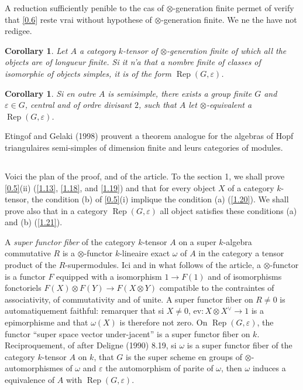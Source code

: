 \documentclass[11pt,a4paper]{article}
\theoremstyle{plain}
\newtheorem{corollary}[theorem]{Corollary}
\theoremstyle{definition}
\newcommand{\ev}{\mathrm{ev}}
\newcommand{\Rep}{\operatorname{Rep}}
\begin{document}
A reduction sufficiently penible to the cas of $\otimes$-generation finite permet of verify that \ref{0.6} reste vrai without hypothese of $\otimes$-generation finite. We ne the have not redigee.

\begin{corollary}\label{0.7}
Let $A$ a category $k$-tensor of $\otimes$-generation finite of which all the objects are of longueur finite. Si it n'a that a nombre finite of classes of isomorphie of objects simples, it is of the form $\Rep(G,\varepsilon)$.
\end{corollary}

\begin{corollary}\label{0.8}
Si en outre $A$ is semisimple, there exists a group finite $G$ and $\varepsilon\in G$, central and of ordre divisant $2$, such that $A$ let $\otimes$-equivalent a $\Rep(G,\varepsilon)$.
\end{corollary}

Etingof and Gelaki (1998) prouvent a theorem analogue for the algebras of Hopf triangulaires semi-simples of dimension finite and leurs categories of modules.

\subsection{}
\label{0.9}

Voici the plan of the proof, and of the article. To the section 1, we shall prove \ref{0.5}(ii) (\ref{1.13}, \ref{1.18}, and \ref{1.19}) and that for every object $X$ of a category $k$-tensor, the condition (b) of \ref{0.5}(i) implique the condition (a) (\ref{1.20}). We shall prove also that in a category $\Rep(G,\varepsilon)$ all object satisfies these conditions (a) and (b) (\ref{1.21}).

A \emph{super functor fiber} of the category $k$-tensor $A$ on a super $k$-algebra commutative $R$ is a $\otimes$-functor $k$-lineaire exact $\omega$ of $A$ in the category a tensor product of the $R$-supermodules. Ici and in what follows of the article, a $\otimes$-functor is a functor $F$ equipped with a isomorphism $1\to F(1)$ and of isomorphisms fonctoriels $F(X)\otimes F(Y)\to F(X\otimes Y)$ compatible to the contraintes of associativity, of commutativity and of unite. A super functor fiber on $R\neq0$ is automatiquement faithful: remarquer that si $X\neq0$, $\ev:X\otimes X^\vee\to 1$ is a epimorphisme and that $\omega(X)$ is therefore not zero. On $\Rep(G,\varepsilon)$, the functor ``super space vector under-jacent'' is a super functor fiber on $k$. Reciproquement, of after Deligne (1990) 8.19, si $\omega$ is a super functor fiber of the category $k$-tensor $A$ on $k$, that $G$ is the super scheme en groups of $\otimes$-automorphismes of $\omega$ and $\varepsilon$ the automorphism of parite of $\omega$, then $\omega$ induces a equivalence of $A$ with $\Rep(G,\varepsilon)$.
\end{document}
